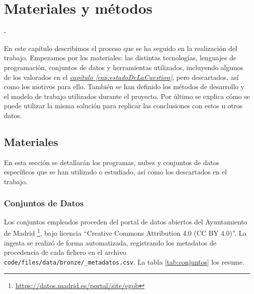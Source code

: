 \chapter{Materiales y métodos}
\label{cap:MaterialesYmetodos}

- 

En este capítulo describimos el proceso que se ha seguido en la realización del trabajo. Empezamos por los materiales: las distintas tecnologías, lenguajes de programación, conjuntos de datos y herramientas utilizados, incluyendo algunos de los valorados en el \hyperref[cap:estadoDeLaCuestion]{\textit{capítulo \ref*{cap:estadoDeLaCuestion}}}, pero descartados, así como los motivos para ello. También se han definido los métodos de desarrollo y el modelo de trabajo utilizados durante el proyecto. Por último se explica cómo se puede utilizar la misma solución para replicar las conclusiones con estos u otros datos.

\section{Materiales}

En esta sección se detallarán los programas, nubes y conjuntos de datos específicos que se han utilizado o estudiado, así como los descartados en el trabajo.

\subsection{Conjuntos de Datos} \label{sec:Materiales_datos}

Los conjuntos empleados proceden del portal de datos abiertos del Ayuntamiento de Madrid \citep{AytoMadrid2025PortalDatos} \footnote{\url{https://datos.madrid.es/portal/site/egob}}, bajo licencia ``Creative Commons Attribution 4.0 (CC BY 4.0)''. La ingesta se realizó de forma automatizada, registrando los metadatos de procedencia de cada fichero en el archivo \texttt{code/files/data/bronze/\_metadatos.csv}. La tabla \ref{tab:conjuntos} los resume.

